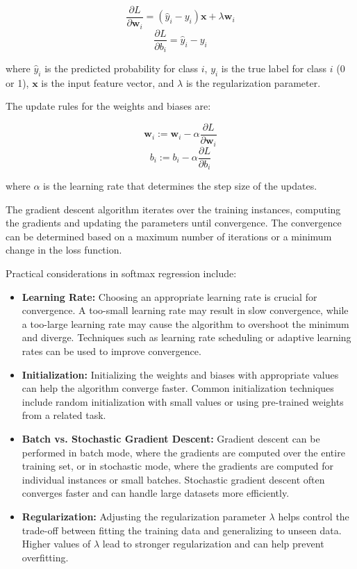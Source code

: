\documentclass[letterpaper,10pt]{article}
\begin{document}
\[ \frac{\partial L}{\partial \mathbf{w}_i} = (\hat{y}_i - y_i) \mathbf{x} + \lambda \mathbf{w}_i \]
\[ \frac{\partial L}{\partial b_i} = \hat{y}_i - y_i \]

where $\hat{y}_i$ is the predicted probability for class $i$, $y_i$ is the true label for class $i$ (0 or 1), $\mathbf{x}$ is the input feature vector, and $\lambda$ is the regularization parameter. \par

The update rules for the weights and biases are:

\[ \mathbf{w}_i := \mathbf{w}_i - \alpha \frac{\partial L}{\partial \mathbf{w}_i} \]
\[ b_i := b_i - \alpha \frac{\partial L}{\partial b_i} \]

where $\alpha$ is the learning rate that determines the step size of the updates. \par

The gradient descent algorithm iterates over the training instances, computing the gradients and updating the parameters until convergence. The convergence can be determined based on a maximum number of iterations or a minimum change in the loss function. \par

Practical considerations in softmax regression include:
\begin{itemize}
  \item \textbf{Learning Rate:} Choosing an appropriate learning rate is crucial for convergence. A too-small learning rate may result in slow convergence, while a too-large learning rate may cause the algorithm to overshoot the minimum and diverge. Techniques such as learning rate scheduling or adaptive learning rates can be used to improve convergence.

  \item \textbf{Initialization:} Initializing the weights and biases with appropriate values can help the algorithm converge faster. Common initialization techniques include random initialization with small values or using pre-trained weights from a related task.

  \item \textbf{Batch vs. Stochastic Gradient Descent:} Gradient descent can be performed in batch mode, where the gradients are computed over the entire training set, or in stochastic mode, where the gradients are computed for individual instances or small batches. Stochastic gradient descent often converges faster and can handle large datasets more efficiently.

  \item \textbf{Regularization:} Adjusting the regularization parameter $\lambda$ helps control the trade-off between fitting the training data and generalizing to unseen data. Higher values of $\lambda$ lead to stronger regularization and can help prevent overfitting.
\end{itemize}
\end{document}

